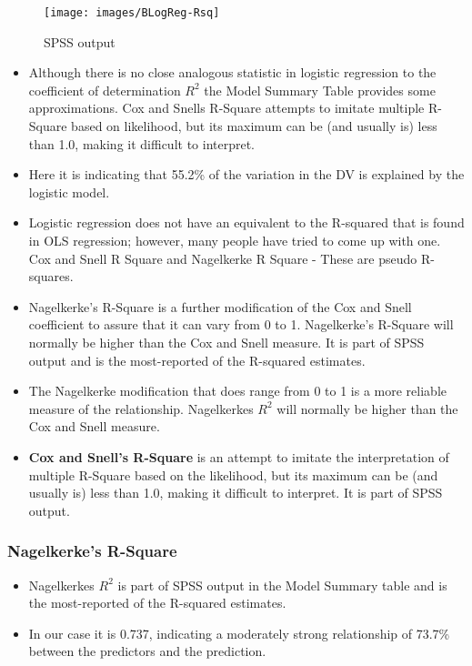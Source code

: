 \documentclass[a4paper,12pt]{article}
\begin{document}
\begin{figure}[h!]
	\centering
	\texttt{[image: images/BLogReg-Rsq]}
	\caption{SPSS output}
	\label{fig:BLogReg-Rsq}
\end{figure}
\begin{itemize}
\item Although there is no close analogous statistic in logistic regression to
the coefficient of determination $R^2$ the Model Summary Table provides some approximations. Cox and Snells R-Square attempts to imitate multiple R-Square based on likelihood, but its maximum can be (and usually is) less than 1.0, making it difficult to interpret. 
\item Here it is indicating that 55.2\% of the variation in the DV is explained by the
logistic model. 
\item Logistic regression does not have an equivalent to the R-squared that is found in OLS regression; however, many people have tried to come up with one.  
Cox  and Snell R Square and Nagelkerke R Square - These are pseudo R-squares. 
\item 	Nagelkerke's R-Square is a further modification of the Cox and Snell coefficient to assure that it can vary from 0 to 1. Nagelkerke's R-Square will normally be higher than the Cox and Snell measure. It is part of SPSS output and is the most-reported of the R-squared estimates.

\item The Nagelkerke modification that does range from 0 to 1 is a more reliable
measure of the relationship. Nagelkerkes $R^2$ will normally be higher than the Cox and Snell measure.



\item \textbf{Cox and Snell's R-Square} is an attempt to imitate the interpretation of multiple R-Square based on the likelihood, but its maximum can be (and usually is) less than 1.0, making it difficult to interpret. It is part of SPSS output.
\end{itemize}

\subsubsection{Nagelkerke's R-Square}
\begin{itemize}
	\item  Nagelkerkes $R^2$ is part of SPSS output in the Model Summary table and is the most-reported of the R-squared estimates. 
	\item In our case it is 0.737, indicating a moderately strong relationship of 73.7\% between the predictors and the prediction.
	
	

\end{itemize}
\end{document}
